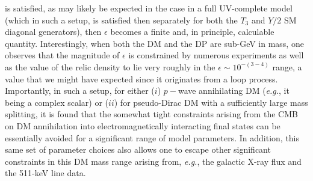 \documentclass[14pt]{article}
\def\eg{{\it e.g.}}
\begin{document}
%
is satisfied, as may likely be expected in the case in a full UV-complete model (which in such a setup, is satisfied then separately for both the $T_3$ and $Y/2$ SM diagonal generators), then 
$\epsilon$ becomes a finite and, in principle, calculable quantity. 
Interestingly, when both the DM and the DP are sub-GeV in mass, one observes that the magnitude of $\epsilon$ is constrained by numerous experiments as well as the value of the relic density 
to lie very roughly in the $\epsilon \sim 10^{-(3-4)}$ range, a value that we might have expected since it originates from a loop process. Importantly, in such a setup, for either ($i$) $p-$wave annihilating 
DM (\eg, it being a complex scalar) or ($ii$) for pseudo-Dirac DM with a sufficiently large mass splitting, it is found that the somewhat tight constraints arising from the CMB on DM annihilation 
into electromagnetically interacting final states can be essentially avoided\cite{Planck:2018vyg,Slatyer:2015jla,Liu:2016cnk,Leane:2018kjk} for a significant range of model parameters. 
In addition, this same set of parameter choices also allows one to escape other significant constraints in this DM mass range arising from, \eg, the galactic X-ray flux\cite{Koechler:2023ual} and the 
511-keV line data\cite{DelaTorreLuque:2023cef}. 
\end{document}
